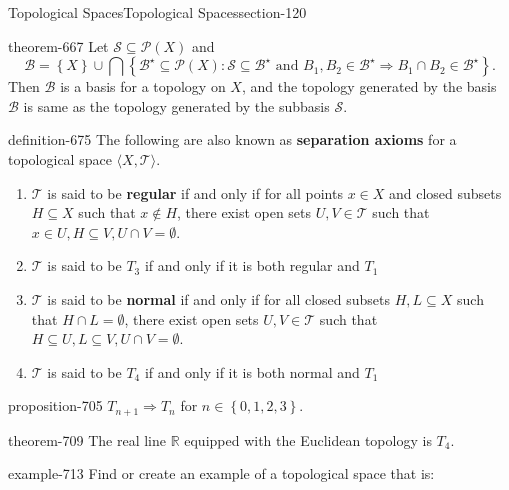 \documentclass[oneside,10pt,]{article}
\newcommand{\terminology}[1]{\textbf{#1}}
\newcommand{\tuple}[1]{\langle #1 \rangle}
\newcommand{\mb}{\mathbb}
\newcommand{\mc}{\mathcal}
\newcommand{\setBuilder}[2]{\left\{#1:#2\right\}}
\newcommand{\setList}[1]{\left\{#1\right\}}
\begin{document}
\begin{sectionptx}{Topological Spaces}{}{Topological Spaces}{}{}{section-120}
\begin{theorem}{}{}{theorem-667}%
\hypertarget{p-668}{}%
Let \(\mc S\subseteq\mc P(X)\) and%
\begin{equation*}
\mc B=\setList{X}\cup\bigcap\setBuilder{\mc B^\star\subseteq\mc P(X)}
{\mc S\subseteq\mc B^\star\text{ and }
B_1,B_2\in\mc B^\star\Rightarrow B_1\cap B_2\in\mc B^\star}.
\end{equation*}
Then \(\mc B\) is a basis for a topology on \(X\), and the topology generated by the basis \(\mc B\) is same as the topology generated by the subbasis \(\mc S\).%
\end{theorem}
\begin{definition}{}{definition-675}%
\hypertarget{p-676}{}%
The following are also known as \terminology{separation axioms} for a topological space \(\tuple{X,\mc T}\).%
\leavevmode%
\begin{enumerate}
\item\hypertarget{li-680}{}\(\mc T\) is said to be \terminology{regular} if and only if for all points \(x\in X\) and closed subsets \(H\subseteq X\) such that \(x\not\in H\), there exist open sets \(U,V\in\mc T\) such that \(x\in U,H\subseteq V,U\cap V=\emptyset\).%
\item\hypertarget{li-688}{}\(\mc T\) is said to be \terminology{\(T_3\)} if and only if it is both regular and \(T_1\)%
\item\hypertarget{li-693}{}\(\mc T\) is said to be \terminology{normal} if and only if for all closed subsets \(H,L\subseteq X\) such that \(H\cap L=\emptyset\), there exist open sets \(U,V\in\mc T\) such that \(H\subseteq U,L\subseteq V,U\cap V=\emptyset\).%
\item\hypertarget{li-700}{}\(\mc T\) is said to be \terminology{\(T_4\)} if and only if it is both normal and \(T_1\)%
\end{enumerate}
\end{definition}
\begin{proposition}{}{}{proposition-705}%
\hypertarget{p-706}{}%
\(T_{n+1}\Rightarrow T_n\) for \(n\in\setList{0,1,2,3}\).%
\end{proposition}
\begin{theorem}{}{}{theorem-709}%
\hypertarget{p-710}{}%
The real line \(\mb R\) equipped with the Euclidean topology is \(T_4\).%
\end{theorem}
\begin{example}{}{example-713}%
\hypertarget{p-714}{}%
Find or create an example of a topological space that is:%
\leavevmode%
\begin{enumerate}

\end{enumerate}
\end{example}
\end{sectionptx}
\end{document}
